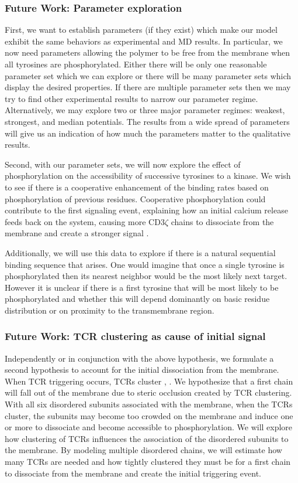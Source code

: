 \documentclass[../../AdvancementSummary.tex]{subfiles}
\begin{document}
\subsubsection{Future Work: Parameter exploration}

First, we want to establish parameters (if they exist) which make our model exhibit the same behaviors as experimental and MD results. In particular, we now need parameters allowing the polymer to be free from the membrane when all tyrosines are phosphorylated. Either there will be only one reasonable parameter set which we can explore or there will be many parameter sets which display the desired properties.  If there are multiple parameter sets then we may try to find other experimental results to narrow our parameter regime. Alternatively, we may explore two or three major parameter regimes: weakest, strongest, and median potentials. The results from a wide spread of parameters will give us an indication of how much the parameters matter to the qualitative results.  

Second, with our parameter sets, we will now explore the effect of phosphorylation on the accessibility of successive tyrosines to a kinase.  We wish to see if there is a cooperative enhancement of the binding rates based on phosphorylation of previous residues.  Cooperative phosphorylation could contribute to the first signaling event, explaining how an initial calcium release feeds back on the system, causing more CD3$\zeta$ chains to dissociate from the membrane and create a stronger signal  \cite{Shi2013}.

Additionally, we will use this data to explore if there is a natural sequential binding sequence that arises.  One would imagine that once a single tyrosine is phosphorylated then its nearest neighbor would be the most likely next target.  However it is unclear if there is a first tyrosine that will be most likely to be phosphorylated and whether this will depend dominantly on basic residue distribution or on proximity to the transmembrane region. 

\subsubsection{Future Work: TCR clustering as cause of initial signal}
Independently or in conjunction with the above hypothesis, we formulate a second hypothesis to account for the initial dissociation from the membrane. When TCR triggering occurs, TCRs cluster \cite{Kupfer1998}, \cite{Samelson2002}. We hypothesize that a first chain will fall out of the membrane due to steric occlusion created by TCR clustering. With all six disordered subunits associated with the membrane, when the TCRs cluster, the subunits may become too crowded on the membrane and induce one or more to dissociate and become accessible to phosphorylation. We will explore how clustering of TCRs influences the association of the disordered subunits to the membrane. By modeling multiple disordered chains, we will estimate how many TCRs are needed and how tightly clustered they must be for a first chain to dissociate from the membrane and create the initial triggering event.
\end{document}
